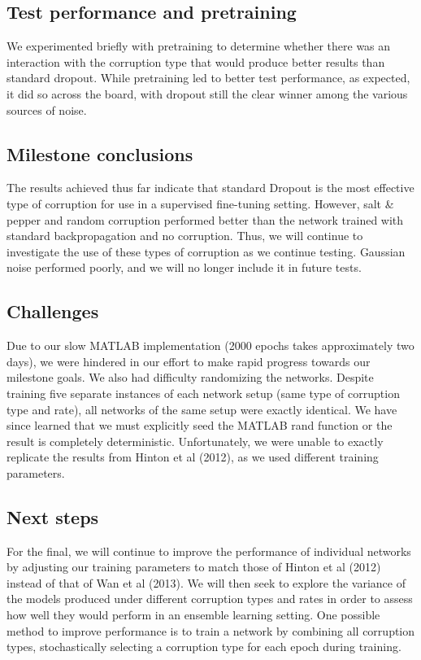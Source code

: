 \documentclass{article} %
\begin{document}
\subsection{Test performance and pretraining}
We experimented briefly with pretraining to determine whether there was an interaction with the corruption type that would produce better results than standard dropout. While pretraining led to better test performance, as expected, it did so across the board, with dropout still the clear winner among the various sources of noise.

\subsection{Milestone conclusions}
The results achieved thus far indicate that standard Dropout is the most effective type of corruption for use in a supervised fine-tuning setting. However, salt \& pepper and random corruption performed better than the network trained with standard backpropagation and no corruption. Thus, we will continue to investigate the use of these types of corruption as we continue testing. Gaussian noise performed poorly, and we will no longer include it in future tests.

\subsection{Challenges}
Due to our slow MATLAB implementation (2000 epochs takes approximately two days), we were hindered in our effort to make rapid progress towards our milestone goals. We also had difficulty randomizing the networks. Despite training five separate instances of each network setup (same type of corruption type and rate), all networks of the same setup were exactly identical. We have since learned that we must explicitly seed the MATLAB rand function or the result is completely deterministic. Unfortunately, we were unable to exactly replicate the results from Hinton et al (2012), as we used different training parameters.

\subsection{Next steps}
For the final, we will continue to improve the performance of individual networks by adjusting our training parameters to match those of Hinton et al (2012) instead of that of Wan et al (2013). We will then seek to explore the variance of the models produced under different corruption types and rates in order to assess how well they would perform in an ensemble learning setting. One possible method to improve performance is to train a network by combining all corruption types, stochastically selecting a corruption type for each epoch during training.
\end{document}
